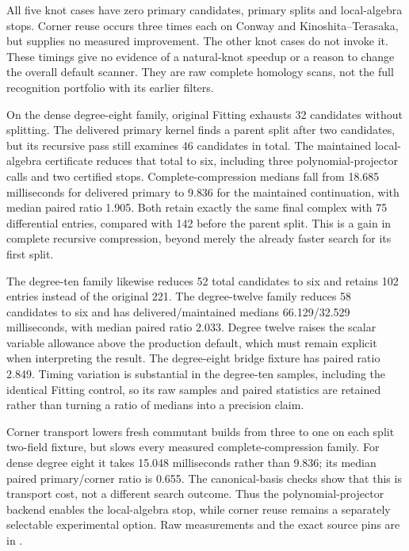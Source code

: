 

All five knot cases have zero primary candidates, primary splits and local-algebra
stops. Corner reuse occurs three times each on Conway and Kinoshita--Terasaka,
but supplies no measured improvement. The other knot cases do not invoke it.
These timings give no evidence of a natural-knot speedup or a reason to change
the overall default scanner. They are raw complete homology scans, not the
full recognition portfolio with its earlier filters.



On the dense degree-eight family, original Fitting exhausts 32 candidates
without splitting. The delivered primary kernel finds a parent split after two
candidates, but its recursive pass still examines 46 candidates in total.
The maintained local-algebra certificate reduces that total to six, including
three polynomial-projector calls and two certified stops. Complete-compression
medians fall from 18.685 milliseconds for delivered primary to 9.836 for the
maintained continuation, with median paired ratio 1.905. Both retain exactly
the same final complex with 75 differential entries, compared with 142 before
the parent split. This is a gain in complete recursive compression, beyond
merely the already faster search for its first split.

The degree-ten family likewise reduces 52 total candidates to six and retains
102 entries instead of the original 221. The degree-twelve family reduces
58 candidates to six and has delivered/maintained medians 66.129/32.529
milliseconds, with median paired ratio 2.033. Degree twelve raises the scalar
variable allowance above the production default, which must remain explicit
when interpreting the result. The degree-eight bridge fixture has paired ratio
2.849. Timing variation is substantial in the degree-ten samples, including
the identical Fitting control, so its raw samples and paired statistics are
retained rather than turning a ratio of medians into a precision claim.

Corner transport lowers fresh commutant builds from three to one on each
split two-field fixture, but slows every measured complete-compression family.
For dense degree eight it takes 15.048 milliseconds rather than 9.836; its
median paired primary/corner ratio is 0.655. The canonical-basis checks show
that this is transport cost, not a different search outcome. Thus the
polynomial-projector backend enables the local-algebra stop, while corner
reuse remains a separately selectable experimental option. Raw measurements
and the exact source pins are in
.
